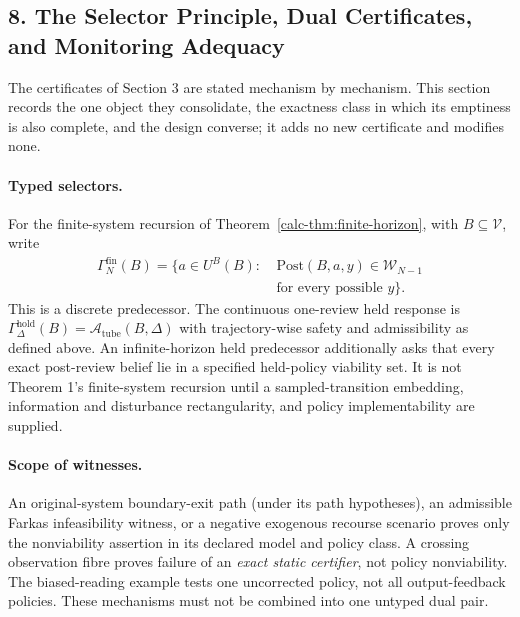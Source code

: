 \documentclass[10pt,twocolumn]{article}
\theoremstyle{definition}
\begin{document}
\subsection{8. The Selector Principle, Dual Certificates, and Monitoring Adequacy}\label{calc-selector-principle}

The certificates of Section 3 are stated mechanism by mechanism. This section records the one object they consolidate, the exactness class in which its emptiness is also complete, and the design converse; it adds no new certificate and modifies none.

\paragraph{Typed selectors.} For the finite-system recursion of Theorem~\ref{calc-thm:finite-horizon}, with \(B\subseteq\mathcal V\), write
\[\begin{aligned}
\Gamma_N^{\mathrm{fin}}(B)=\{a\in U^B(B):\ &\mathrm{Post}(B,a,y)\in\mathcal W_{N-1}\\
&\text{for every possible }y\}.
\end{aligned}\]
This is a discrete predecessor. The continuous one-review held response is \(\Gamma_\Delta^{\mathrm{hold}}(B)=\mathcal A_{\mathrm{tube}}(B,\Delta)\) with trajectory-wise safety and admissibility as defined above. An infinite-horizon held predecessor additionally asks that every exact post-review belief lie in a specified held-policy viability set. It is not Theorem 1's finite-system recursion until a sampled-transition embedding, information and disturbance rectangularity, and policy implementability are supplied.

\paragraph{Scope of witnesses.} An original-system boundary-exit path (under its path hypotheses), an admissible Farkas infeasibility witness, or a negative exogenous recourse scenario proves only the nonviability assertion in its declared model and policy class. A crossing observation fibre proves failure of an \emph{exact static certifier}, not policy nonviability. The biased-reading example tests one uncorrected policy, not all output-feedback policies. These mechanisms must not be combined into one untyped dual pair.
\end{document}
